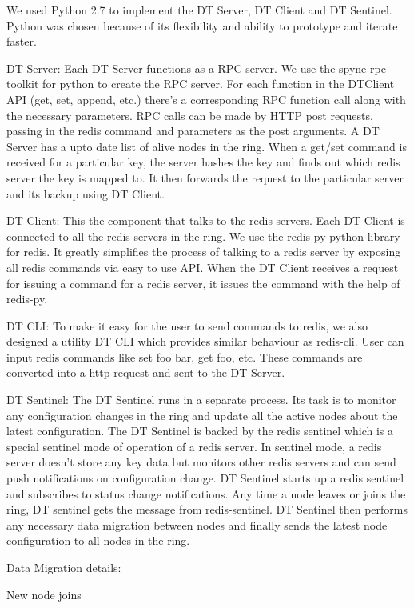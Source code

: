 \documentclass[10pt,twocolumn,letterpaper]{article}
\begin{document}
We used Python 2.7 to implement the DT Server, DT Client and DT Sentinel. Python was chosen because of its flexibility and ability to prototype and iterate faster. 

DT Server: Each DT Server functions as a RPC server. We use the spyne rpc toolkit for python to create the RPC server. For each function in the DTClient API (get, set, append, etc.) there's a corresponding RPC function call along with the necessary parameters. RPC calls can be made by HTTP post requests, passing in the redis command and parameters as the post arguments. A DT Server has a upto date list of alive nodes in the ring. When a get/set command is received for a particular key, the server hashes the key and finds out which redis server the key is mapped to. It then forwards the request to the particular server and its backup using DT Client.

DT Client: This the component that talks to the redis servers. Each DT Client is connected to all the redis servers in the ring. We use the redis-py python library for redis. It greatly simplifies the process of talking to a redis server by exposing all redis commands via easy to use API. When the DT Client receives a request for issuing a command for a redis server, it issues the command with the help of redis-py.

DT CLI: To make it easy for the user to send commands to redis, we also designed a utility DT CLI which provides similar behaviour as redis-cli. User can input redis commands like set foo bar, get foo, etc. These commands are converted into a http request and sent to the DT Server. 

DT Sentinel: The DT Sentinel runs in a separate process. Its task is to monitor any configuration changes in the ring and update all the active nodes about the latest configuration. The DT Sentinel is backed by the redis sentinel which is a special sentinel mode of operation of a redis server. In sentinel mode, a redis server doesn't store any key data but monitors other redis servers and can send push notifications on configuration change. DT Sentinel starts up a redis sentinel and subscribes to status change notifications. Any time a node leaves or joins the ring, DT sentinel gets the message from redis-sentinel. DT Sentinel then performs any necessary data migration between nodes and finally sends the latest node configuration to all nodes in the ring.

Data Migration details: 

New node joins
\end{document}
